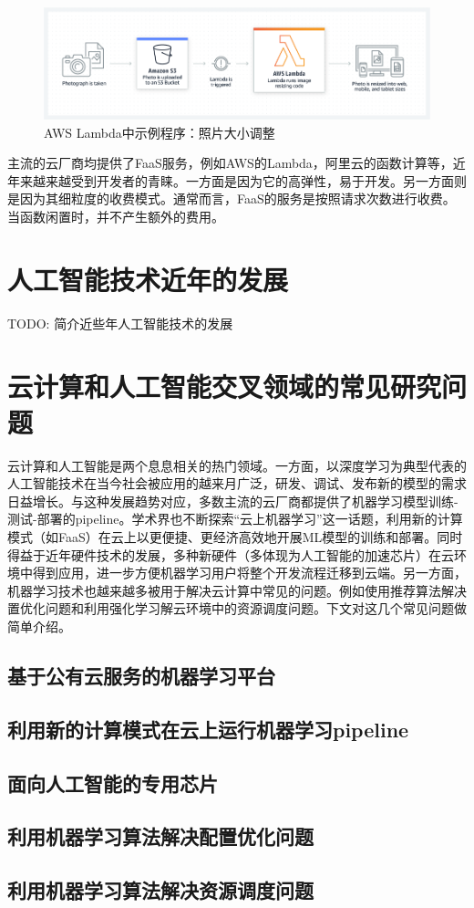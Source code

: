 \begin{figure}
    \centerline{\includegraphics[width=\textwidth]{figures/aws-lambda-resize.png}}
    \caption{AWS Lambda中示例程序：照片大小调整}
    \label{aws_resize}
\end{figure}

主流的云厂商均提供了FaaS服务，例如AWS的Lambda，阿里云的函数计算等，近年来越来越受到开发者的青睐。一方面是因为它的高弹性，易于开发。另一方面则是因为其细粒度的收费模式。通常而言，FaaS的服务是按照请求次数进行收费。当函数闲置时，并不产生额外的费用。

\section{人工智能技术近年的发展}
TODO: 简介近些年人工智能技术的发展

\section{云计算和人工智能交叉领域的常见研究问题}
云计算和人工智能是两个息息相关的热门领域。一方面，以深度学习为典型代表的人工智能技术在当今社会被应用的越来月广泛，研发、调试、发布新的模型的需求日益增长。与这种发展趋势对应，多数主流的云厂商都提供了机器学习模型训练-测试-部署的pipeline。学术界也不断探索“云上机器学习”这一话题，利用新的计算模式（如FaaS）在云上以更便捷、更经济高效地开展ML模型的训练和部署。同时得益于近年硬件技术的发展，多种新硬件（多体现为人工智能的加速芯片）在云环境中得到应用，进一步方便机器学习用户将整个开发流程迁移到云端。另一方面，机器学习技术也越来越多被用于解决云计算中常见的问题。例如使用推荐算法解决置优化问题和利用强化学习解云环境中的资源调度问题。下文对这几个常见问题做简单介绍。

\subsection{基于公有云服务的机器学习平台}
\subsection{利用新的计算模式在云上运行机器学习pipeline}
\subsection{面向人工智能的专用芯片}
\subsection{利用机器学习算法解决配置优化问题}
\subsection{利用机器学习算法解决资源调度问题}
